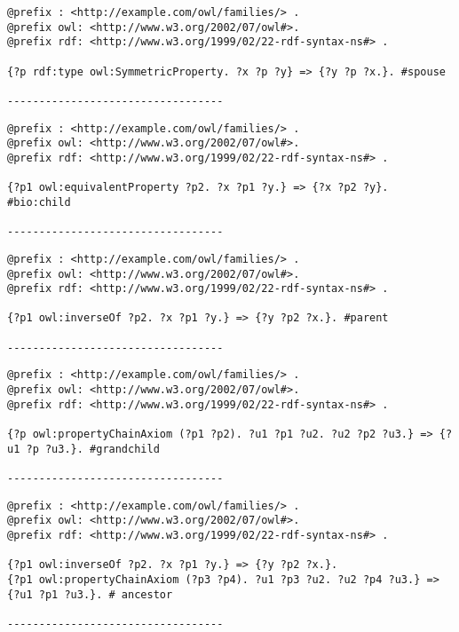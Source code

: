 \documentclass{article}
\begin{document}
\begin{verbatim}
@prefix : <http://example.com/owl/families/> .
@prefix owl: <http://www.w3.org/2002/07/owl#>.
@prefix rdf: <http://www.w3.org/1999/02/22-rdf-syntax-ns#> .

{?p rdf:type owl:SymmetricProperty. ?x ?p ?y} => {?y ?p ?x.}. #spouse

----------------------------------

\end{verbatim}

\begin{verbatim}
@prefix : <http://example.com/owl/families/> .
@prefix owl: <http://www.w3.org/2002/07/owl#>.
@prefix rdf: <http://www.w3.org/1999/02/22-rdf-syntax-ns#> .

{?p1 owl:equivalentProperty ?p2. ?x ?p1 ?y.} => {?x ?p2 ?y}. #bio:child

----------------------------------

\end{verbatim}

\begin{verbatim}
@prefix : <http://example.com/owl/families/> .
@prefix owl: <http://www.w3.org/2002/07/owl#>.
@prefix rdf: <http://www.w3.org/1999/02/22-rdf-syntax-ns#> .

{?p1 owl:inverseOf ?p2. ?x ?p1 ?y.} => {?y ?p2 ?x.}. #parent

----------------------------------

\end{verbatim}

\begin{verbatim}
@prefix : <http://example.com/owl/families/> .
@prefix owl: <http://www.w3.org/2002/07/owl#>.
@prefix rdf: <http://www.w3.org/1999/02/22-rdf-syntax-ns#> .

{?p owl:propertyChainAxiom (?p1 ?p2). ?u1 ?p1 ?u2. ?u2 ?p2 ?u3.} => {?u1 ?p ?u3.}. #grandchild

----------------------------------

\end{verbatim}

\begin{verbatim}
@prefix : <http://example.com/owl/families/> .
@prefix owl: <http://www.w3.org/2002/07/owl#>.
@prefix rdf: <http://www.w3.org/1999/02/22-rdf-syntax-ns#> .

{?p1 owl:inverseOf ?p2. ?x ?p1 ?y.} => {?y ?p2 ?x.}.
{?p1 owl:propertyChainAxiom (?p3 ?p4). ?u1 ?p3 ?u2. ?u2 ?p4 ?u3.} => {?u1 ?p1 ?u3.}. # ancestor

----------------------------------

\end{verbatim}
\end{document}
